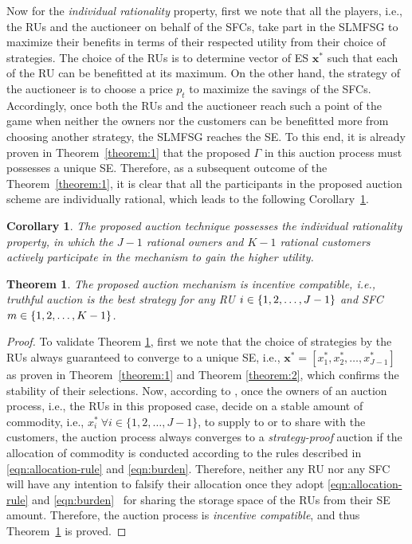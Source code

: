 \documentclass[journal,10pt]{IEEEtran}
\newtheorem{corollary}{Corollary}
\newtheorem{theorem}{\bf Theorem}
\begin{document}
Now for the \emph{individual rationality} property, first we note that all the players, i.e., the RUs and the auctioneer on behalf of the SFCs, take part in the SLMFSG to maximize their benefits in terms of their respected utility from their choice of strategies. The choice of the RUs is to determine vector of ES $\mathbf{x}^*$ such that each of the RU can be benefitted at its maximum. On the other hand,  the strategy of the auctioneer is to choose a price $p_t$ to maximize the savings of the SFCs. Accordingly, once both the RUs and the auctioneer reach such a point of the game when neither the owners nor the customers can be benefitted more from choosing another strategy, the SLMFSG reaches the SE. To this end, it is already proven in Theorem~\ref{theorem:1} that the proposed $\Gamma$ in this auction process must possesses a unique SE. Therefore, as a subsequent outcome of the Theorem~\ref{theorem:1}, it is clear that all the participants in the proposed auction scheme are individually rational, which leads to the following Corollary~\ref{corollary:1}.
\begin{corollary}
The proposed auction technique possesses the individual rationality property, in which the $J-1$ rational owners and $K-1$ rational customers actively participate in the mechanism to gain the higher utility.
\label{corollary:1}
\end{corollary}
\begin{theorem}
The proposed auction mechanism is incentive compatible, i.e., truthful auction is the best strategy for any RU $i\in\mathcal\{1,2,\hdots,J-1\}$ and SFC $m\in\mathcal\{1,2,\hdots,K-1\}$.
\label{theorem:3}
\end{theorem}
\begin{proof}
To validate Theorem \ref{theorem:3}, first we note that the choice of strategies by the RUs always guaranteed to converge to a unique SE, i.e., $\mathbf{x^*} = [x_1^*, x_2^*, \hdots, x_{J-1}^*]$ as proven in Theorem~\ref{theorem:1} and Theorem \ref{theorem:2}, which confirms the stability of their selections. Now, according to \cite{Huang-doubleauction:2002}, once the owners of an auction process, i.e., the RUs in this proposed case, decide on a stable amount of commodity, i.e., $x_i^*~\forall i\in\{1,2,\hdots,J-1\}$, to supply to or to share with the customers, the auction process always converges to a \emph{strategy-proof} auction if the allocation of commodity is conducted according to the rules described in \eqref{eqn:allocation-rule} and \eqref{eqn:burden}.  Therefore, neither any RU nor any SFC will have any intention to falsify their allocation once they adopt \eqref{eqn:allocation-rule} and \eqref{eqn:burden}~\cite{Huang-doubleauction:2002} for sharing the storage space of the RUs from their SE amount. Therefore, the auction process is \emph{incentive compatible}, and thus Theorem~\ref{theorem:3} is proved.
\end{proof}
\end{document}

